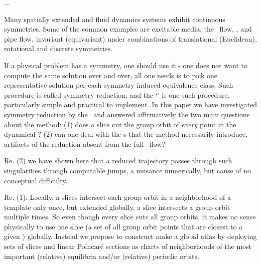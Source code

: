 

\ifboyscout
	...
\fi

Many spatially extended and fluid dynamics systems exhibit continuous
symmetries. Some of the common examples are  excitable
media, the \KS\
flow, {\pCf}, and
pipe flow\rf{Wk04,Kerswell05}, invariant (equivariant) under
combinations of translational (Euclidean), rotational and
discrete symmetries.

If a physical problem has a symmetry, one should use it - one does not
want to compute the same solution over and over, all one needs is to
pick one representative solution per each symmetry induced equivalence
class. Such procedure is called symmetry reduction, and the `\mslices' is
one such procedure, particularly simple and practical to implement. In this
paper we have investigated symmetry reduction by the \mslices\ and
answered affirmatively the two main questions about the method:
(1) does a slice cut the group orbit of \emph{every} point in the dynamical \statesp?
(2) can one deal with the {\sset s} that the method necessarily
introduce, artifacts of the reduction absent from the full
\statesp\ flow?

Re. (2) we have shown here that a reduced trajectory
passes through such singularities through computable jumps,
a nuisance numerically, but cause of no conceptual difficulty.

Re. (1): Locally, a slices intersect each group orbit in a neighborhood of a
template only once,
but extended globally, a slice intersects a group orbit multiple times.
So even though every slice cuts all group orbits, it makes no sense
physically to use one slice (a set of all group orbit points that are
closest to a given {\template}) globally. Instead we propose to
construct make a global atlas by
deploying sets of slices and linear Poincar\'e sections as charts of
neighborhoods of the most important (relative) equilibria and/or
(relative) periodic orbits.

